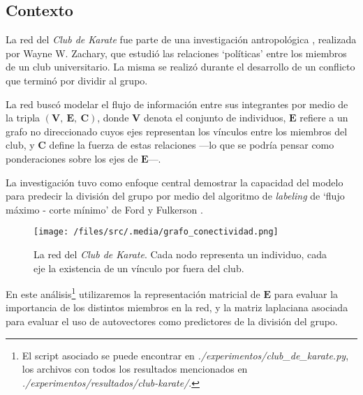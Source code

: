 
\vspace{1em}
\subsection{Contexto}

La red del \textit{Club de Karate} fue parte de una investigación antropológica \cite{Zachary}, realizada por Wayne W. Zachary, que estudió las relaciones `políticas' entre los miembros de un club universitario. La misma se realizó durante el desarrollo de un conflicto que terminó por dividir al grupo. 

La red buscó modelar el flujo de información entre sus integrantes por medio de la tripla $(\mathbf{V},\ \mathbf{E},\ \mathbf{C})$, donde $\mathbf{V}$ denota el conjunto de individuos, $\mathbf{E}$ refiere a un grafo no direccionado cuyos ejes representan los vínculos entre los miembros del club, y $\mathbf{C}$ define la fuerza de estas relaciones ---lo que se podría pensar como ponderaciones sobre los ejes de $\mathbf{E}$---. 

\vspace{1em}
La investigación tuvo como enfoque central demostrar la capacidad del modelo para predecir la división del grupo por medio del algoritmo de \textit{labeling} de `flujo máximo - corte mínimo' de Ford y Fulkerson \cite{Ford}.

\vspace{1em}
\begin{figure}[!htbp]
\texttt{[image: /files/src/.media/grafo\_conectividad.png]}
\caption{La red del \textit{Club de Karate}. Cada nodo representa un individuo, cada eje la existencia de un vínculo por fuera del club.}
\end{figure}


\vspace{1em}
En este análisis\footnote{El script asociado se puede encontrar en \textit{./experimentos/club\_de\_karate.py}, los archivos con todos los resultados mencionados en \textit{./experimentos/resultados/club-karate/}.} utilizaremos la representación matricial de $\mathbf{E}$ para evaluar la importancia de los distintos miembros en la red, y la matriz laplaciana asociada para evaluar el uso de autovectores como predictores de la división del grupo. 

 


\newpage
\vspace{2em}
